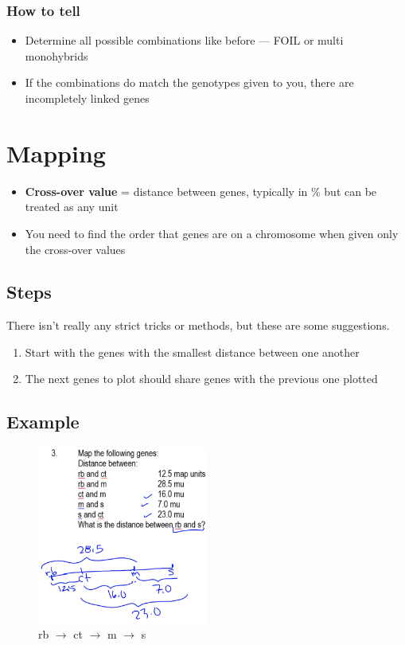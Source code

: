 \documentclass[a4paper,12pt]{article}
\begin{document}
\subsubsection{How to tell}
\begin{itemize}
    \item{Determine all possible combinations like before --- FOIL or multi monohybrids}
    \item{If the combinations do match the genotypes given to you, there are incompletely linked genes}
\end{itemize}

\section{Mapping}
\begin{itemize}
    \item{\textbf{Cross-over value} = distance between genes, typically in \% but can be treated as any unit}
    \item{You need to find the order that genes are on a chromosome when given only the cross-over values}
\end{itemize}

\subsection{Steps}
There isn't really any strict tricks or methods, but these are some suggestions.

\begin{enumerate}
    \item{Start with the genes with the smallest distance between one another}
    \item{The next genes to plot should share genes with the previous one plotted}
\end{enumerate}

\subsection{Example}

\begin{figure}[H]
    \centering
    \includegraphics[width=0.5\textwidth]{mapping}
    \caption{rb $\longrightarrow$ ct $\longrightarrow$ m $\longrightarrow$ s}
\end{figure}
\end{document}
